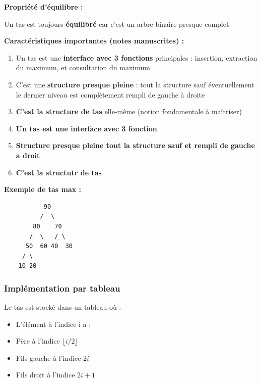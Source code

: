 \documentclass[12pt,a4paper]{article}
\begin{document}
\begin{notecours}
\textbf{Propriété d'équilibre :}

Un tas est toujours \textbf{équilibré} car c'est un arbre binaire presque complet.

\textbf{Caractéristiques importantes (notes manuscrites) :}
\begin{enumerate}
    \item Un tas est une \textbf{interface avec 3 fonctions} principales : insertion, extraction du maximum, et consultation du maximum
    \item C'est une \textbf{structure presque pleine} : tout la structure sauf éventuellement le dernier niveau est complètement rempli de gauche à droite
    \item \textbf{C'est la structure de tas} elle-même (notion fondamentale à maîtriser)
    \item \textbf{Un tas est une interface avec 3 fonction}
    \item \textbf{Structure presque pleine tout la structure sauf et rempli de gauche a droit}
    \item \textbf{C'est la structutr de tas}
\end{enumerate}
\end{notecours}

\begin{exemple}
\textbf{Exemple de tas max :}
\begin{verbatim}
           90
          /  \
        80    70
       /  \   / \
      50  60 40  30
     / \
    10 20
\end{verbatim}
\end{exemple}

\subsubsection{Implémentation par tableau}

\begin{important}
Le tas est stocké dans un tableau où :
\begin{itemize}
    \item L'élément à l'indice i a :
    \item Père à l'indice $\lfloor i/2 \rfloor$
    \item Fils gauche à l'indice $2i$
    \item Fils droit à l'indice $2i + 1$
\end{itemize}
\end{important}
\end{document}
